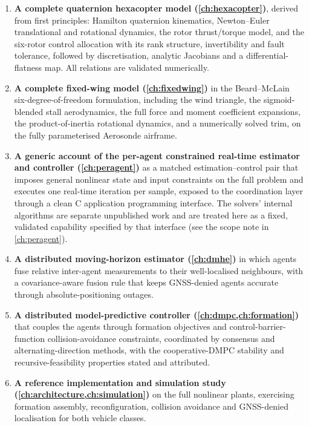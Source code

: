 \begin{enumerate}[leftmargin=1.6em]
  \item \textbf{A complete quaternion hexacopter model
        (\cref{ch:hexacopter})}, derived from first principles: Hamilton
        quaternion kinematics, Newton--Euler translational and rotational
        dynamics, the rotor thrust/torque model, and the six-rotor control
        allocation with its rank structure, invertibility and fault tolerance,
        followed by discretisation, analytic Jacobians and a differential-%
        flatness map. All relations are validated numerically.
  \item \textbf{A complete fixed-wing model (\cref{ch:fixedwing})} in the
        Beard--McLain six-degree-of-freedom formulation, including the wind
        triangle, the sigmoid-blended stall aerodynamics, the full force and
        moment coefficient expansions, the product-of-inertia rotational
        dynamics, and a numerically solved trim, on the fully parameterised
        Aerosonde airframe.
  \item \textbf{A generic account of the per-agent constrained real-time
        estimator and controller (\cref{ch:peragent})} as a matched
        estimation--control pair that imposes general nonlinear state and input
        constraints on the full problem and executes one real-time iteration per
        sample, exposed to the coordination layer through a clean C application
        programming interface. The solvers' internal algorithms are separate
        unpublished work and are treated here as a fixed, validated capability
        specified by that interface (see the scope note in \cref{ch:peragent}).
  \item \textbf{A distributed moving-horizon estimator (\cref{ch:dmhe})} in
        which agents fuse relative inter-agent measurements to their
        well-localised neighbours, with a covariance-aware fusion rule that
        keeps GNSS-denied agents accurate through absolute-positioning outages.
  \item \textbf{A distributed model-predictive controller
        (\cref{ch:dmpc,ch:formation})} that couples the agents through formation
        objectives and control-barrier-function collision-avoidance constraints,
        coordinated by consensus and alternating-direction methods, with the
        cooperative-DMPC stability and recursive-feasibility properties stated
        and attributed.
  \item \textbf{A reference implementation and simulation study
        (\cref{ch:architecture,ch:simulation})} on the full nonlinear plants,
        exercising formation assembly, reconfiguration, collision avoidance and
        GNSS-denied localisation for both vehicle classes.
\end{enumerate}

